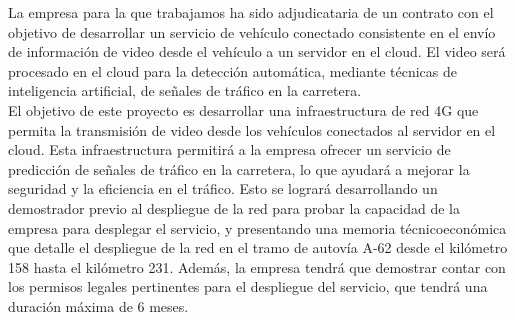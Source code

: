 La empresa para la que trabajamos ha sido adjudicataria de un contrato con el objetivo de desarrollar un servicio de vehículo conectado consistente en el envío de información de video desde el vehículo a un servidor en el cloud. El video será procesado en el cloud para la detección automática, mediante técnicas de inteligencia artificial, de señales de tráfico en la carretera.\\

El objetivo de este proyecto es desarrollar una infraestructura de red 4G que permita la transmisión de video desde los vehículos conectados al servidor en el cloud. Esta infraestructura permitirá a la empresa ofrecer un servicio de predicción de señales de tráfico en la carretera, lo que ayudará a mejorar la seguridad y la eficiencia en el tráfico. Esto se logrará desarrollando un demostrador previo al despliegue de la red para probar la capacidad de la empresa para desplegar el servicio, y presentando una memoria técnicoeconómica que detalle el despliegue de la red en el tramo de autovía A-62 desde el kilómetro 158 hasta el kilómetro 231. Además, la empresa tendrá que demostrar contar con los permisos legales pertinentes para el despliegue del servicio, que tendrá una duración máxima de 6 meses.